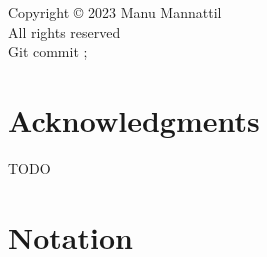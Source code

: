 
\newpage\thispagestyle{empty}

\begin{center*}
  \begin{Spacing}{1.25}
  Copyright {\copyright} 2023 Manu Mannattil\\
  All rights reserved
  \ifsustyle
    \relax
  \else
    \phantom{}\\[2em]\color{gray}Git commit \href{https://github.com/manu-mannattil/thesis/tree/\gitHash}{\texttt{\gitShortHash}}; \gitCommitterDate
  \fi
  \end{Spacing}
\end{center*}


\newpage\thispagestyle{empty}
\chapter*{Acknowledgments}

\sloppy
TODO

\ifdeadtree
  \blankpage
\fi


\newpage\pagestyle{headings}

\ifsustyle
  \relax
\else
  \setlength{\cftbeforechapterskip}{0.5em}
\fi

\tableofcontents


\chapter*{Notation}




\mainmatter

\pagestyle{headings}










